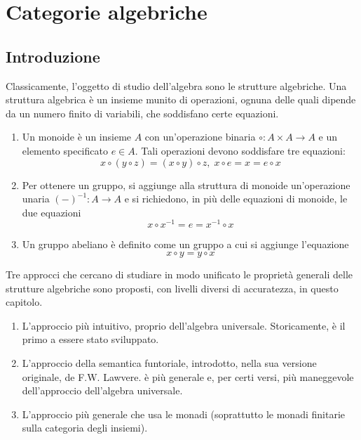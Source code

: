 \chapter{Categorie algebriche}\label{cap_cat_alg}

\section{Introduzione}\label{sec_intro}

Classicamente, l'oggetto di studio dell'algebra sono le strutture algebriche. Una struttura algebrica è un insieme munito di operazioni,
ognuna delle quali dipende da un numero finito di variabili, che soddisfano certe equazioni. 

\begin{examples}\label{esempi_strutture_alg} 
\hfill
\begin{enumerate}
\item Un monoide è un insieme $A$ con un'operazione binaria $\circ \colon A \times A \to A$ e un elemento specificato $e \in A.$ Tali
operazioni devono soddisfare tre equazioni: 
$$x \circ (y \circ z) = (x \circ y) \circ z, \; x \circ e = x = e \circ x$$
\item Per ottenere un gruppo, si aggiunge alla struttura di monoide un'operazione unaria $(-)^{-1} \colon A \to A$ e si richiedono, in più
delle equazioni di monoide, le due equazioni
$$x \circ x^{-1} = e = x^{-1} \circ x$$
\item Un gruppo abeliano è definito come un gruppo a cui si aggiunge l'equazione
$$x \circ y = y \circ x$$
\end{enumerate} 
\end{examples} 

Tre approcci che cercano di studiare in modo unificato le proprietà generali delle strutture algebriche sono proposti, con livelli diversi di 
accuratezza, in questo capitolo.
\begin{enumerate}
\item L'approccio più intuitivo, proprio dell'algebra universale. Storicamente, è il primo a essere stato sviluppato.
\item L'approccio della semantica funtoriale, introdotto, nella sua versione originale, de F.W. Lawvere. è più generale e, per certi versi, più 
maneggevole dell'approccio dell'algebra universale.
\item L'approccio più generale che usa le monadi (soprattutto le monadi finitarie sulla categoria degli insiemi).
\end{enumerate}

